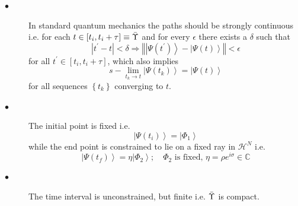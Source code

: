 \documentclass[aps,preprint]{revtex4}
\begin{document}
\begin{description}
\item[$\bullet $] In standard quantum mechanics the paths should be strongly
continuous i.e. for each $t\in \left[ t_{i},t_{i}+\tau \right] \equiv \bar{%
\Upsilon}$ and for every $\epsilon $ there exists a $\delta $ such that 
\begin{equation}
\left\vert t^{\prime }-t\right\vert <\delta \Rightarrow \left\Vert
\left\vert \Psi \left( t^{\prime }\right) \right\rangle -\left\vert \Psi
\left( t\right) \right\rangle \right\Vert <\epsilon
\end{equation}%
for all $t^{\prime }\in \left[ t_{i},t_{i}+\tau \right] $, which also
implies 
\begin{equation}
s-\lim_{t_{k}\rightarrow t}\left\vert \Psi \left( t_{k}\right) \right\rangle
=\left\vert \Psi \left( t\right) \right\rangle
\end{equation}%
for all sequences $\left\{ t_{k}\right\} $ converging to $t$.

\item[$\bullet $] The initial point is fixed i.e. 
\begin{equation}
\left\vert \Psi \left( t_{i}\right) \right\rangle =\left\vert \Phi
_{1}\right\rangle
\end{equation}%
while the end point is constrained to lie on a fixed ray in $\mathcal{H}^{N}$
i.e.%
\begin{equation}
\left\vert \Psi \left( t_{f}\right) \right\rangle =\eta \left\vert \Phi
_{2}\right\rangle ;\quad \Phi _{2}\text{ is fixed, }\eta =\rho e^{i\sigma
}\in \mathbb{C}
\end{equation}

\item[$\bullet $] The time interval is unconstrained, but finite i.e. $\bar{%
\Upsilon}$ is compact.


\end{description}
\end{document}
